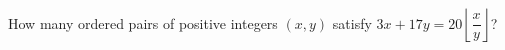 How many ordered pairs of positive integers $(x,y)$ satisfy $3x+17y=20\left\lfloor\dfrac{x}{y}\right\rfloor$?
